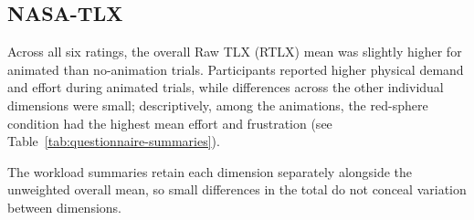 \documentclass[
english,                 %
bibtex,                  %
includeExtraAbstracts, %
]{kththesis}
\newenvironment{evidenceblock}{\par\addvspace{6pt}\noindent\begin{minipage}{\linewidth}}{\end{minipage}\par\addvspace{6pt}}
\numberwithin{listing}{chapter}
\begin{document}
\subsection{NASA-TLX}
\label{sec:nasa-tlx-results}
Across all six ratings, the overall Raw TLX (RTLX) mean was slightly higher for animated than no-animation trials. Participants reported higher physical demand and effort during animated trials, while differences across the other individual dimensions were small; descriptively, among the animations, the red-sphere condition had the highest mean effort and frustration (see Table~\ref{tab:questionnaire-summaries}).

\begin{evidenceblock}
\normalsize
The workload summaries retain each dimension separately alongside the unweighted overall mean, so small differences in the total do not conceal variation between dimensions.


\end{evidenceblock}
\end{document}
